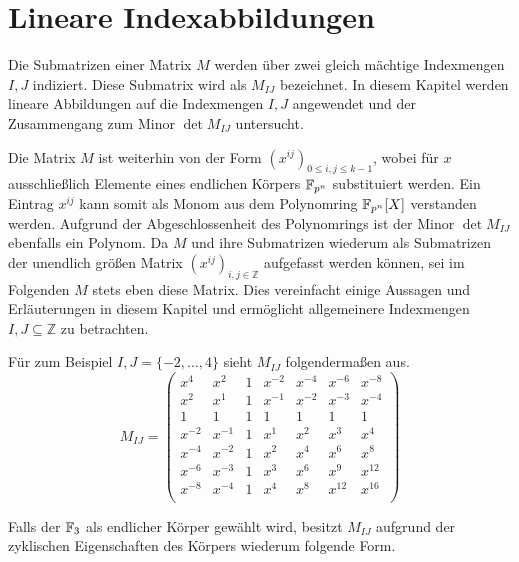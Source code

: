 \section{Lineare Indexabbildungen}

Die Submatrizen einer Matrix $M$ werden über zwei gleich mächtige Indexmengen $I,J$ indiziert. Diese Submatrix wird als $M_{IJ}$ bezeichnet. 
In diesem Kapitel werden lineare Abbildungen auf die Indexmengen $I,J$ angewendet und der Zusammengang zum Minor $\det M_{IJ}$ untersucht.


Die Matrix $M$ ist weiterhin von der Form $\left( x^{ij} \right)_{0\leq i,j \leq k-1}$, wobei für $x$ ausschließlich Elemente eines endlichen Körpers $\field{p}[n]$ substituiert werden. Ein Eintrag $x^{ij}$ kann somit als Monom aus dem Polynomring $\field{p}[n][X]$ verstanden werden. Aufgrund der Abgeschlossenheit des Polynomrings ist der Minor $\det M_{IJ}$ ebenfalls ein Polynom. Da $M$ und ihre Submatrizen wiederum als Submatrizen der unendlich größen Matrix $\left( x^{ij} \right)_{i,j \in \mathbb{Z}}$ aufgefasst werden können, sei im Folgenden $M$ stets eben diese Matrix. Dies vereinfacht einige Aussagen und Erläuterungen in diesem Kapitel und ermöglicht allgemeinere Indexmengen $I,J \subseteq \mathbb{Z}$ zu betrachten.

Für zum Beispiel $I,J = \{-2, \dots, 4\}$ sieht $M_{IJ}$ folgendermaßen aus.
\begin{equation*}
    M_{IJ} = \begin{pmatrix}
        x^4     & x^{2} & 1    & x^{-2} & x^{-4}& x^{-6}& x^{-8}\\
        x^{2}   & x^{1} & 1    & x^{-1} & x^{-2}& x^{-3}& x^{-4}\\
        1       & 1     & 1    & 1      & 1     & 1     & 1     \\
        x^{-2}  & x^{-1}& 1    & x^{1}  & x^{2} & x^{3} & x^{4} \\
        x^{-4}  & x^{-2}& 1    & x^{2}  & x^{4} & x^{6} & x^{8} \\
        x^{-6}  & x^{-3}& 1    & x^{3}  & x^{6} & x^{9} & x^{12} \\
        x^{-8}  & x^{-4}& 1    & x^{4}  & x^{8} & x^{12} & x^{16} \\
    \end{pmatrix}
\end{equation*}

Falls der $\field{3}$ als endlicher Körper gewählt wird, besitzt $M_{IJ}$ aufgrund der zyklischen Eigenschaften des Körpers wiederum folgende Form.

